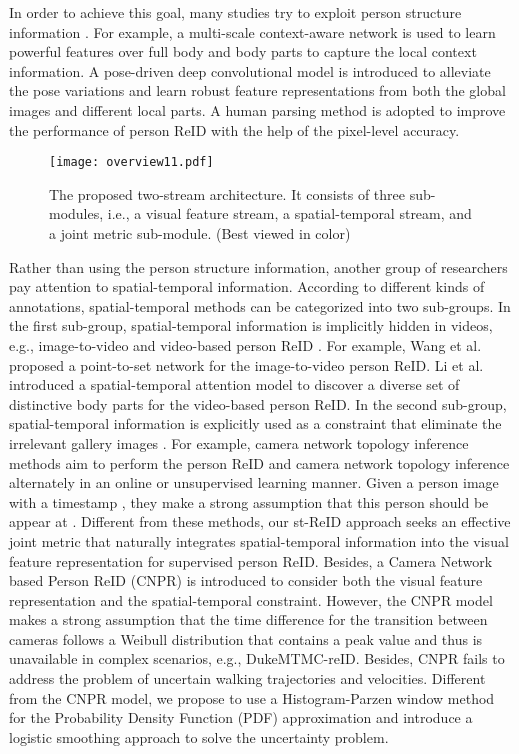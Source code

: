 \documentclass[letterpaper]{article} \usepackage{aaai19}  \usepackage{times}  \usepackage{helvet}  \usepackage{courier}  \usepackage{url}  \usepackage{graphicx}  \usepackage{subfig}
\begin{document}
In order to achieve this goal, many studies try to exploit person structure information \cite{Li_2017_CVPR,Zhao_2017_ICCV,Su2017ICCV,Zhao_2017_CVPR,Kalayeh_2018_CVPR,Song_2018_CVPR}. For example, a multi-scale context-aware network \cite{Li_2017_CVPR} is used to learn powerful features over full body and body parts to capture the local context information. A pose-driven deep convolutional model \cite{Su2017ICCV} is introduced to alleviate the pose variations and learn robust feature representations from both the global images and different local parts. A human parsing method \cite{Song_2018_CVPR} is adopted to improve the performance of person ReID with the help of the pixel-level accuracy.
\begin{figure*}[!t]
\centering
\texttt{[image: overview11.pdf]}
\caption{The proposed two-stream architecture. It consists of three sub-modules, i.e., a visual feature stream, a spatial-temporal stream, and a joint metric sub-module. (Best viewed in color)}
\label{fig:overview}
\end{figure*}

Rather than using the person structure information, another group of researchers pay attention to spatial-temporal information. According to different kinds of annotations, spatial-temporal methods can be categorized into two sub-groups. In the first sub-group, spatial-temporal information is implicitly hidden in videos, e.g., image-to-video \cite{wang2017tcsvt} and video-based person ReID \cite{Li_2018_CVPR,zheng2016mars}. For example, Wang et al. \cite{wang2017tcsvt} proposed a point-to-set network for the image-to-video person ReID. Li et al. \cite{Li_2018_CVPR} introduced a spatial-temporal attention model to discover a diverse set of distinctive body parts for the video-based person ReID. In the second sub-group, spatial-temporal information is explicitly used as a constraint that eliminate the irrelevant gallery images \cite{yeong,huang2016mmm,Lv_2018_CVPR}. For example, camera network topology inference methods \cite{yeong,Lv_2018_CVPR} aim to perform the person ReID and camera network topology inference alternately in an online or unsupervised learning manner. Given a person image with a timestamp , they make a strong assumption that this person should be appear at . Different from these methods, our st-ReID approach seeks an effective joint metric that naturally integrates spatial-temporal information into the visual feature representation for supervised person ReID. Besides, a Camera Network based Person ReID (CNPR) \cite{huang2016mmm} is introduced to consider both the visual feature representation and the spatial-temporal constraint. However, the CNPR model makes a strong assumption that the time difference for the transition between cameras follows a Weibull distribution that contains a peak value and thus is unavailable in complex scenarios, e.g., DukeMTMC-reID. Besides, CNPR fails to address the problem of uncertain walking trajectories and velocities. Different from the CNPR model, we propose to use a Histogram-Parzen window method for the Probability Density Function (PDF) approximation and introduce a logistic smoothing approach to solve the uncertainty problem.
\end{document}
